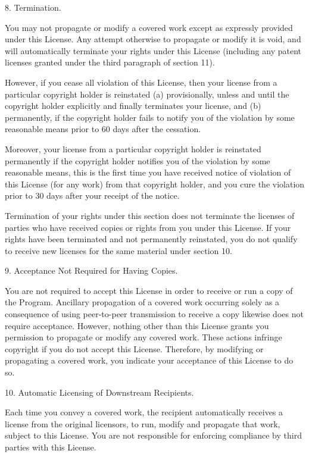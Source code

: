 \documentclass[letterpaper,12pt]{article}
\begin{document}
{8. Termination.

You may not propagate or modify a covered work except as expressly provided under this License. Any attempt otherwise to propagate or modify it is void, and will automatically terminate your rights under this License (including any patent licenses granted under the third paragraph of section 11).

However, if you cease all violation of this License, then your license from a particular copyright holder is reinstated (a) provisionally, unless and until the copyright holder explicitly and finally terminates your license, and (b) permanently, if the copyright holder fails to notify you of the violation by some reasonable means prior to 60 days after the cessation.

Moreover, your license from a particular copyright holder is reinstated permanently if the copyright holder notifies you of the violation by some reasonable means, this is the first time you have received notice of violation of this License (for any work) from that copyright holder, and you cure the violation prior to 30 days after your receipt of the notice.

Termination of your rights under this section does not terminate the licenses of parties who have received copies or rights from you under this License. If your rights have been terminated and not permanently reinstated, you do not qualify to receive new licenses for the same material under section 10.

9. Acceptance Not Required for Having Copies.

You are not required to accept this License in order to receive or run a copy of the Program. Ancillary propagation of a covered work occurring solely as a consequence of using peer-to-peer transmission to receive a copy likewise does not require acceptance. However, nothing other than this License grants you permission to propagate or modify any covered work. These actions infringe copyright if you do not accept this License. Therefore, by modifying or propagating a covered work, you indicate your acceptance of this License to do so.

10. Automatic Licensing of Downstream Recipients.

Each time you convey a covered work, the recipient automatically receives a license from the original licensors, to run, modify and propagate that work, subject to this License. You are not responsible for enforcing compliance by third parties with this License.

}
\end{document}
